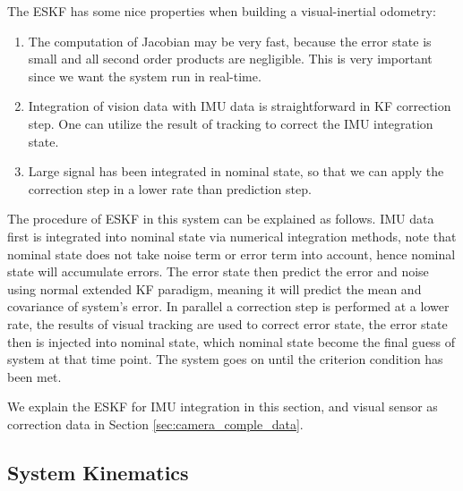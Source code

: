 The ESKF has some nice properties when building a visual-inertial odometry:                                                                                                                                                                                                                                                                                                              
\begin{enumerate}
	\item The computation of Jacobian may be very fast, because the error state is small and all second order products are negligible. This is very important since we want the system run in real-time.
	\item Integration of vision data with IMU data is straightforward in KF correction step. One can utilize the result of tracking to correct the IMU integration state.
	\item Large signal has been integrated in nominal state, so that we can apply the correction step in a lower rate than prediction step.
\end{enumerate}

The procedure of ESKF in this system can be explained as follows. IMU data first is integrated into nominal state via numerical integration methods, note that nominal state does not take noise term or error term into account, hence nominal state will accumulate errors. The error state then predict the error and noise using normal extended KF paradigm, meaning it will predict the mean and covariance of system's error. In parallel a correction step is performed at a lower rate, the results of visual tracking are used to correct error state, the error state then is injected into nominal state, which nominal state become the final guess of system at that time point. The system goes on until the criterion condition has been met.

We explain the ESKF for IMU integration in this section, and visual sensor as correction data in Section \ref{sec:camera_comple_data}.


\subsection{System Kinematics}
\label{subsec:ESKF_IMU_sub2}

